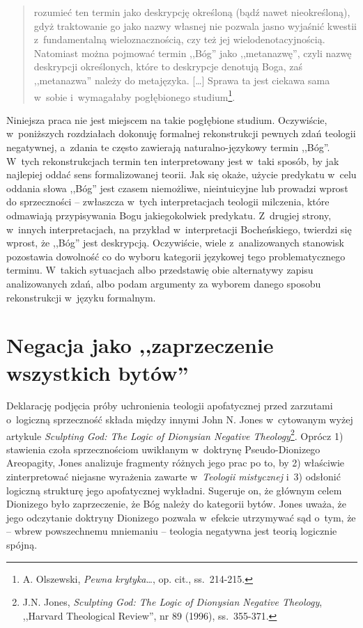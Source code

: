 \begin{quote}
rozumieć ten termin jako deskrypcję określoną (bądź nawet nieokreśloną), gdyż traktowanie go jako nazwy własnej nie pozwala jasno wyjaśnić kwestii z~fundamentalną wieloznacznością, czy też jej wielodenotacyjnością. Natomiast można pojmować termin ,,Bóg'' jako ,,metanazwę'', czyli nazwę deskrypcji określonych, które to deskrypcje denotują Boga, zaś ,,metanazwa'' należy do metajęzyka. [\ldots] Sprawa ta jest ciekawa sama w~sobie i~wymagałaby pogłębionego studium\footnote{A. Olszewski, \textit{Pewna krytyka}\ldots, op. cit., ss.~214-215.}.
\end{quote}

Niniejsza praca nie jest miejscem na takie pogłębione studium. Oczywiście, w~poniższych rozdziałach dokonuję formalnej rekonstrukcji pewnych zdań teologii negatywnej, a~zdania te często zawierają naturalno-językowy termin ,,Bóg''. W~tych rekonstrukcjach termin ten interpretowany jest w~taki sposób, by jak najlepiej oddać sens formalizowanej teorii. Jak się okaże, użycie predykatu w~celu oddania słowa ,,Bóg'' jest czasem niemożliwe, nieintuicyjne lub prowadzi wprost do sprzeczności – zwłaszcza w~tych interpretacjach teologii milczenia, które odmawiają przypisywania Bogu jakiegokolwiek predykatu. Z~drugiej strony, w~innych interpretacjach, na przykład w~interpretacji Bocheńskiego, twierdzi się wprost, że ,,Bóg'' jest deskrypcją. Oczywiście, wiele z~analizowanych stanowisk pozostawia dowolność co do wyboru kategorii językowej tego problematycznego terminu. W~takich sytuacjach albo przedstawię obie alternatywy zapisu analizowanych zdań, albo podam argumenty za wyborem danego sposobu rekonstrukcji w~języku formalnym.


\chapter{Negacja jako ,,zaprzeczenie wszystkich bytów''}\label{sil-jones}

Deklarację podjęcia próby uchronienia teologii apofatycznej przed zarzutami o~logiczną sprzeczność składa między innymi John N. Jones w~cytowanym wyżej artykule \textit{Sculpting God: The Logic of Dionysian Negative Theology}\footnote{J.N. Jones, \textit{Sculpting God: The Logic of Dionysian Negative Theology}, ,,Harvard Theological Review'', nr 89 (1996), ss.~355-371.}. Oprócz 1) stawienia czoła sprzecznościom uwikłanym w~doktrynę Pseudo-Dionizego Areopagity, Jones analizuje fragmenty różnych jego prac po to, by 2) właściwie zinterpretować niejasne wyrażenia zawarte w~\textit{Teologii mistycznej} i~3) odsłonić logiczną strukturę jego apofatycznej wykładni. Sugeruje on, że głównym celem Dionizego było zaprzeczenie, że Bóg należy do kategorii bytów. Jones uważa, że jego odczytanie doktryny Dionizego pozwala w~efekcie utrzymywać sąd o~tym, że -- wbrew powszechnemu mniemaniu -- teologia negatywna jest teorią logicznie spójną.

